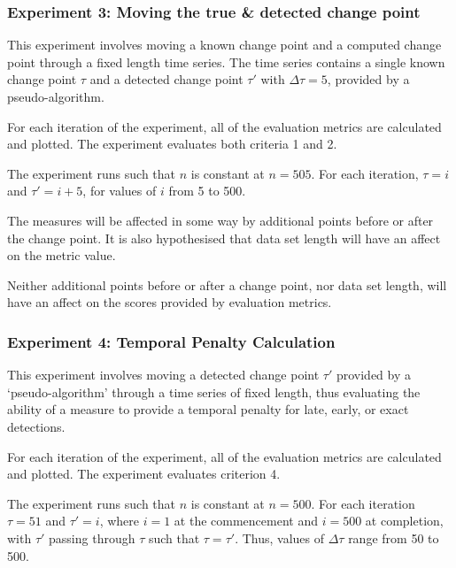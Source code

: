 \documentclass[../main.tex]{subfiles}
\begin{document}
\subsubsection{Experiment 3: Moving the true \& detected change point}

This experiment involves moving a known change point and a computed change point through a fixed length time series. The time series contains a single known change point $\tau$ and a detected change point $\tau'$ with $\Delta \tau = 5$, provided by a pseudo-algorithm.

For each iteration of the experiment, all of the evaluation metrics are calculated and plotted. The experiment evaluates both criteria 1 and 2.

The experiment runs such that $n$ is constant at $n=505$. For each iteration, $\tau = i$ and $\tau' = i + 5$, for values of $i$ from 5 to 500.

\begin{hypothesis}
    The measures will be affected in some way by additional points before or after the change point. It is also hypothesised that data set length will have an affect on the metric value.
\end{hypothesis}

\begin{nullhypothesis}
    Neither additional points before or after a change point, nor data set length, will have an affect on the scores provided by evaluation metrics.
\end{nullhypothesis}

\subsubsection{Experiment 4: Temporal Penalty Calculation}

This experiment involves moving a detected change point $\tau'$ provided by a `pseudo-algorithm' through a time series of fixed length, thus evaluating the ability of a measure to provide a temporal penalty for late, early, or exact detections.

For each iteration of the experiment, all of the evaluation metrics are calculated and plotted. The experiment evaluates criterion 4.

The experiment runs such that $n$ is constant at $n=500$. For each iteration $\tau = 51$ and $\tau' = i$, where $i = 1$ at the commencement and $i = 500$ at completion, with $\tau'$ passing through $\tau$ such that $\tau = \tau'$. Thus, values of $\Delta \tau$ range from 50 to 500.
\end{document}
